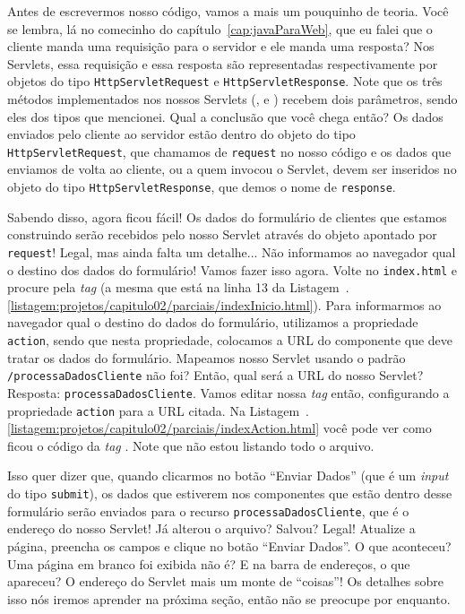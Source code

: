 Antes de escrevermos nosso código, vamos a mais um pouquinho de teoria. Você se lembra, lá no comecinho do capítulo~\ref{cap:javaParaWeb}, que eu falei que o cliente manda uma requisição para o servidor e ele manda uma resposta? Nos Servlets, essa requisição e essa resposta são representadas respectivamente por objetos do tipo \texttt{HttpServletRequest} e \texttt{HttpServletResponse}. Note que os três métodos implementados nos nossos Servlets (,  e ) recebem dois parâmetros, sendo eles dos tipos que mencionei. Qual a conclusão que você chega então? Os dados enviados pelo cliente ao servidor estão dentro do objeto do tipo \texttt{HttpServletRequest}, que chamamos de \texttt{request} no nosso código e os dados que enviamos de volta ao cliente, ou a quem invocou o Servlet, devem ser inseridos no objeto do tipo \texttt{HttpServletResponse}, que demos o nome de \texttt{response}.

Sabendo disso, agora ficou fácil! Os dados do formulário de clientes que estamos construindo serão recebidos pelo nosso Servlet através do objeto apontado por \texttt{request}! Legal, mas ainda falta um detalhe... Não informamos ao navegador qual o destino dos dados do formulário! Vamos fazer isso agora. Volte no \texttt{index.html} e procure pela \textit{tag}  (a mesma que está na linha 13 da Listagem~\thechapter.\ref{listagem:projetos/capitulo02/parciais/indexInicio.html}). Para informarmos ao navegador qual o destino do dados do formulário, utilizamos a propriedade \texttt{action}, sendo que nesta propriedade, colocamos a URL do componente que deve tratar os dados do formulário. Mapeamos nosso Servlet usando o padrão \texttt{/processaDadosCliente} não foi? Então, qual será a URL do nosso Servlet? Resposta: \texttt{processaDadosCliente}. Vamos editar nossa \textit{tag}  então, configurando a propriedade \texttt{action} para a URL citada. Na Listagem~\thechapter.\ref{listagem:projetos/capitulo02/parciais/indexAction.html} você pode ver como ficou o código da \textit{tag} . Note que não estou listando todo o arquivo.


Isso quer dizer que, quando clicarmos no botão ``Enviar Dados'' (que é um \textit{input} do tipo \texttt{submit}), os dados que estiverem nos componentes que estão dentro desse formulário serão enviados para o recurso \texttt{processaDadosCliente}, que é o endereço do nosso Servlet! Já alterou o arquivo? Salvou? Legal! Atualize a página, preencha os campos e clique no botão ``Enviar Dados''. O que aconteceu? Uma página em branco foi exibida não é? E na barra de endereços, o que apareceu? O endereço do Servlet mais um monte de ``coisas''! Os detalhes sobre isso nós iremos aprender na próxima seção, então não se preocupe por enquanto.

